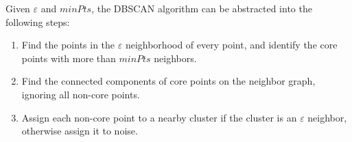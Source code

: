 Given $\varepsilon$ and $minPts$, the DBSCAN algorithm can be abstracted into the following steps:
\begin{enumerate}
    \item Find the points in the $\varepsilon$ neighborhood of every point, and identify the core points with more than $minPts$ neighbors.
    \item Find the connected components of core points on the neighbor graph, ignoring all non-core points.
    \item Assign each non-core point to a nearby cluster if the cluster is an  $\varepsilon$ neighbor, otherwise assign it to noise.
\end{enumerate}
